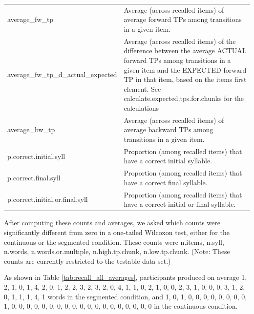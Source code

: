 \documentclass[]{article}
\begin{document}
\begin{table}[!h]
{\begin{tabular}[t]{ll}
average\_fw\_tp & Average (across recalled items) of average forward TPs among transitions in a given item.\\
average\_fw\_tp\_d\_actual\_expected & Average (across recalled items) of the difference between the average ACTUAL forward TPs among transitions in a given item and the EXPECTED forward TP in that item, based on the items first element. See calculate.expected.tps.for.chunks for the calculations\\
average\_bw\_tp & Average (across recalled items) of average backward TPs among transitions in a given item.\\
\addlinespace
p.correct.initial.syll & Proportion (among recalled items) that have a correct initial syllable.\\
p.correct.final.syll & Proportion (among recalled items) that have a correct final syllable.\\
p.correct.initial.or.final.syll & Proportion (among recalled items) that have a correct initial or final syllable.\\
\bottomrule
\end{tabular}}
\end{table}

After computing these counts and averages, we asked which counts were
significantly different from zero in a one-tailed Wilcoxon test, either
for the continuous or the segmented condition. These counts were
n.items, n.syll, n.words, n.words.or.multiple, n.high.tp.chunk,
n.low.tp.chunk. (Note: These counts are currently restricted to the
testable data set.)

As shown in Table \ref{tab:recall_all_averages}, participants produced
on average 1, 2, 1, 0, 1, 4, 2, 0, 1, 2, 2, 3, 2, 3, 2, 0, 4, 1, 1, 0,
2, 1, 0, 0, 2, 3, 1, 0, 0, 0, 3, 1, 2, 0, 1, 1, 1, 4, 1 words in the
segmented condition, and 1, 0, 1, 0, 0, 0, 0, 0, 0, 0, 0, 1, 0, 0, 0, 0,
0, 0, 0, 0, 0, 0, 0, 0, 0, 0, 0, 0, 0, 0, 0 in the continuous condition.
\end{document}
